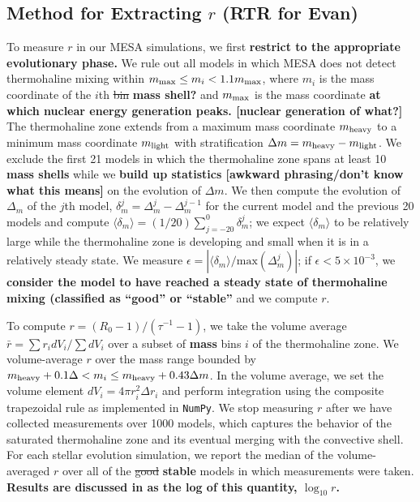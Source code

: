 \subsection{Method for Extracting $r$ \textbf{(RTR for Evan)}}
To measure $r$ in our MESA simulations, we first \textbf{restrict to the appropriate evolutionary phase.}
We rule out all models in which MESA does not detect thermohaline mixing within $m_{\rm max} \leq m_i < 1.1 m_{\rm max}$, where $m_i$ is the mass coordinate of the $i$th \sout{bin} \textbf{mass shell?}
and $m_{\rm max}$ is the mass coordinate \textbf{at which nuclear energy generation peaks. [nuclear generation of what?]}
The thermohaline zone extends
from a maximum mass coordinate $m_{\rm heavy}$ to a minimum mass coordinate $m_{\rm light}$ with stratification $\Delta m = m_{\rm heavy} - m_{\rm light}$.
We exclude the first 21 models in which the thermohaline zone spans at least 10 \textbf{mass shells} %
while we \textbf{build up statistics [awkward phrasing/don't know what this means]} on the evolution of $\Delta m$.
We then compute the evolution of $\Delta_{m}$ of the $j$th model, $\delta_m^j = \Delta_m^{j} - \Delta_m^{j-1}$ for the current model and the previous 20 models and compute $\langle \delta_m \rangle = (1/20)\sum_{j=-20}^0 \delta_m^j$; we expect $\langle \delta_m \rangle$ to be relatively large while the thermohaline zone is developing and small when it is in a relatively steady state.
We measure $\epsilon = |\langle \delta_m \rangle / \mathrm{max}(\Delta_m^j)|$; if $\epsilon < 5 \times 10^{-3}$, we %
\textbf{consider the model to have reached a steady state of thermohaline mixing (classified as ``good'' or ``stable''}
and we compute $r$.

To compute $r = (R_0 - 1)/(\tau^{-1} - 1)$, we take the volume average $\bar{r} = \sum r_i dV_i / \sum dV_i$ over a subset of \textbf{mass} bins $i$ of the thermohaline zone.
We volume-average $r$ over the mass range bounded by $m_{\rm{heavy}} + 0.1\Delta  < m_i \leq m_{\rm heavy} + 0.43\Delta m$.
In the volume average, we set the volume element $dV_i = 4\pi r_i^2 \Delta r_i$ and perform integration using the composite trapezoidal rule as implemented in \texttt{NumPy}.
We stop measuring $r$ after we have collected measurements over 1000 models, which captures the behavior of the saturated thermohaline zone and its eventual merging with the convective shell.
For each stellar evolution simulation, we report the median of the volume-averaged $r$ over all of the \sout{good} \textbf{stable} models in which measurements were taken. \textbf{Results are discussed in as the log of this quantity, $\log_{10} r$.}
